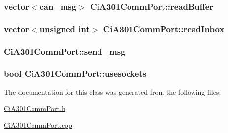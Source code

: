 \subsubsection[{\texorpdfstring{read\+Buffer}{readBuffer}}]{\setlength{\rightskip}{0pt plus 5cm}vector$<${\bf can\+\_\+msg}$>$ Ci\+A301\+Comm\+Port\+::read\+Buffer\hspace{0.3cm}{\ttfamily [private]}}\hypertarget{classCiA301CommPort_a8b904f3591ecfb99fd82271343727215}{}\label{classCiA301CommPort_a8b904f3591ecfb99fd82271343727215}
\subsubsection[{\texorpdfstring{read\+Inbox}{readInbox}}]{\setlength{\rightskip}{0pt plus 5cm}vector$<$unsigned int$>$ Ci\+A301\+Comm\+Port\+::read\+Inbox\hspace{0.3cm}{\ttfamily [private]}}\hypertarget{classCiA301CommPort_a41b2fcb24a27e5280417db03d8cdb399}{}\label{classCiA301CommPort_a41b2fcb24a27e5280417db03d8cdb399}
\subsubsection[{\texorpdfstring{send\+\_\+msg}{send_msg}}]{ Ci\+A301\+Comm\+Port\+::send\+\_\+msg\hspace{0.3cm}{\ttfamily [private]}}\hypertarget{classCiA301CommPort_ade81ac897a5d851d946dd7a18245b75d}{}\label{classCiA301CommPort_ade81ac897a5d851d946dd7a18245b75d}
\subsubsection[{\texorpdfstring{usesockets}{usesockets}}]{\setlength{\rightskip}{0pt plus 5cm}bool Ci\+A301\+Comm\+Port\+::usesockets\hspace{0.3cm}{\ttfamily [private]}}\hypertarget{classCiA301CommPort_a579e0de814111bde3bbe18cceb76ce64}{}\label{classCiA301CommPort_a579e0de814111bde3bbe18cceb76ce64}


The documentation for this class was generated from the following files\+:\begin{DoxyCompactItemize}
\item 
\hyperlink{CiA301CommPort_8h}{Ci\+A301\+Comm\+Port.\+h}\item 
\hyperlink{CiA301CommPort_8cpp}{Ci\+A301\+Comm\+Port.\+cpp}\end{DoxyCompactItemize}
